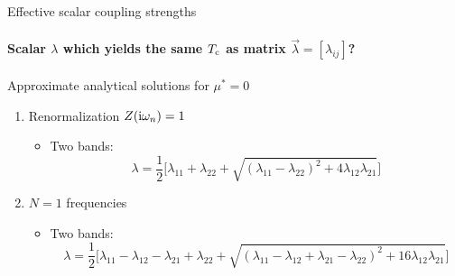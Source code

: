 \documentclass[10pt]{beamer}
\begin{document}
    \begin{frame}[label=scalars]{Effective scalar coupling strengths}
        \framesubtitle{Scalar $\lambda$ which yields the same $T \sb{\text{c}}$ as matrix
                  $\vec \lambda = [\lambda_{i j}]$?}

        Approximate analytical solutions for $\mu^* = 0$
        \begin{enumerate}
            \item Renormalization $Z(\mathrm i \omega_n) = 1$
            \begin{center}
            \end{center}
            \begin{itemize}
                \item Two bands:
                \begin{equation*}
                    \lambda = \frac 1 2 \Big[ \lambda_{11} + \lambda_{22} + \sqrt{
                        (\lambda_{1 1} - \lambda_{2 2})^2
                        + 4 \lambda_{1 2} \lambda_{2 1}
                        }
                    \Big]
                \end{equation*}
            \end{itemize}
            \item $N = 1$  frequencies
            \begin{center}
            \end{center}
            \begin{itemize}
                \item Two bands:
                \begin{equation*}
                    \lambda = \frac 1 2 \Big[
                          \lambda_{1 1} - \lambda_{1 2}
                        - \lambda_{2 1} + \lambda_{2 2}
                        + \sqrt{
                            ( \lambda_{1 1} - \lambda_{1 2}
                            + \lambda_{2 1} - \lambda_{2 2} )^2
                            + 16 \lambda_{1 2} \lambda_{2 1}
                            }
                    \Big]
                \end{equation*}
            \end{itemize}
        \end{enumerate}
    \end{frame}
\end{document}
